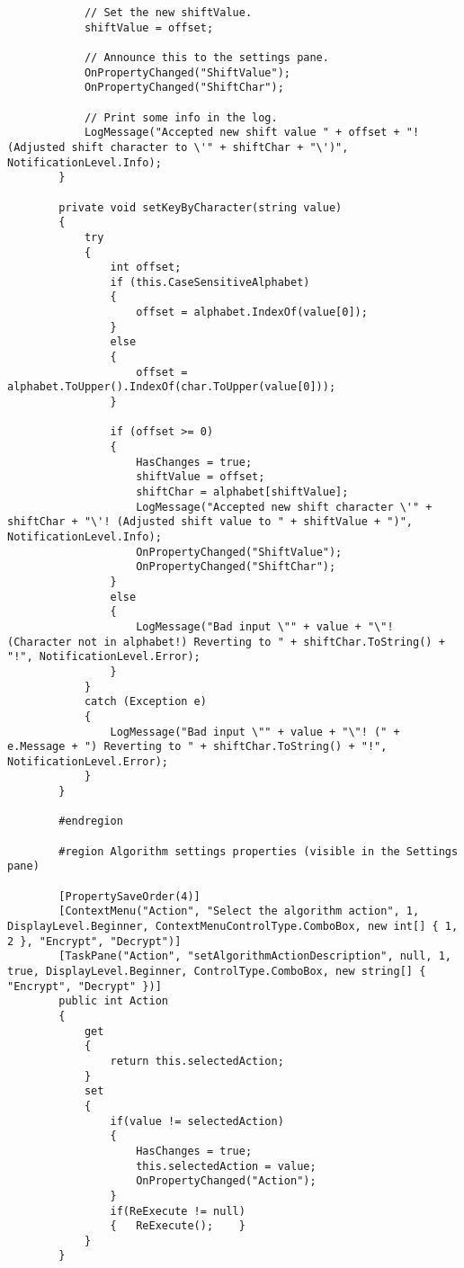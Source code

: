 \begin{lstlisting}
            // Set the new shiftValue.
            shiftValue = offset;

            // Announce this to the settings pane.
            OnPropertyChanged("ShiftValue");
            OnPropertyChanged("ShiftChar");

            // Print some info in the log.
            LogMessage("Accepted new shift value " + offset + "! (Adjusted shift character to \'" + shiftChar + "\')", NotificationLevel.Info);
        }

        private void setKeyByCharacter(string value)
        {
            try
            {
                int offset;
                if (this.CaseSensitiveAlphabet)
                {
                    offset = alphabet.IndexOf(value[0]);
                }
                else
                {
                    offset = alphabet.ToUpper().IndexOf(char.ToUpper(value[0]));
                }

                if (offset >= 0)
                {
                    HasChanges = true;
                    shiftValue = offset;
                    shiftChar = alphabet[shiftValue];
                    LogMessage("Accepted new shift character \'" + shiftChar + "\'! (Adjusted shift value to " + shiftValue + ")", NotificationLevel.Info);
                    OnPropertyChanged("ShiftValue");
                    OnPropertyChanged("ShiftChar");
                }
                else
                {
                    LogMessage("Bad input \"" + value + "\"! (Character not in alphabet!) Reverting to " + shiftChar.ToString() + "!", NotificationLevel.Error);
                }
            }
            catch (Exception e)
            {
                LogMessage("Bad input \"" + value + "\"! (" + e.Message + ") Reverting to " + shiftChar.ToString() + "!", NotificationLevel.Error);
            }
        }

        #endregion

        #region Algorithm settings properties (visible in the Settings pane)

        [PropertySaveOrder(4)]
        [ContextMenu("Action", "Select the algorithm action", 1, DisplayLevel.Beginner, ContextMenuControlType.ComboBox, new int[] { 1, 2 }, "Encrypt", "Decrypt")]
        [TaskPane("Action", "setAlgorithmActionDescription", null, 1, true, DisplayLevel.Beginner, ControlType.ComboBox, new string[] { "Encrypt", "Decrypt" })]
        public int Action
        {
            get
            {
                return this.selectedAction;
            }
            set
            {
                if(value != selectedAction)
                {
                	HasChanges = true;
	                this.selectedAction = value;
    	            OnPropertyChanged("Action");
    	        }
                if(ReExecute != null)
                {	ReExecute();	}
            }
        }


\end{lstlisting}
